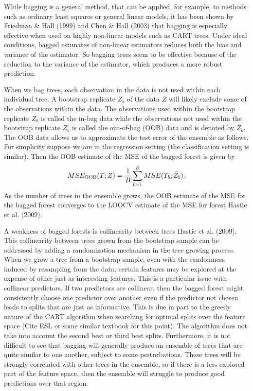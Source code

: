 \documentclass[12pt,twoside]{reedthesis}
\theoremstyle{definition}
\theoremstyle{definition}
\theoremstyle{definition}
\theoremstyle{remark}
\begin{document}
While bagging is a general method, that can be applied, for example, to
methods such as ordinary least squares or general linear models, it has
been shown by Friedman \& Hall (1999) and Chen \& Hall (2003) that
bagging is especially effective when used on highly non-linear models
such as CART trees. Under ideal conditions, bagged estimates of
non-linear estimators reduces both the bias and variance of the
estimator. So bagging trees seem to be effective because of the
reduction to the variance of the estimator, which produces a more robust
prediction. \par

When we bag trees, each observation in the data is not used within each
individual tree. A bootstrap replicate \(Z_b\) of the data \(Z\) will
likely exclude some of the observations within the data. The
observations used within the bootstrap replicate \(Z_b\) is called the
in-bag data while the observations not used within the bootstrap
replicate \(Z_b\) is called the out-of-bag (OOB) data and is denoted by
\(\bar{Z}_b\). The OOB data allows us to approximate the test error of
the ensemble as follows. For simplicity suppose we are in the regression
setting (the classification setting is similar). Then the OOB estimate
of the MSE of the bagged forest is given by
\[MSE_{\textup{OOB}}(T;Z)=\frac{1}{B}\sum_{b=1}^B MSE(T_b;\bar{Z}_b).\]
As the number of trees in the ensemble grows, the OOB estimate of the
MSE for the bagged forest converges to the LOOCV estimate of the MSE for
forest Hastie et al. (2009). \par

A weakness of bagged forests is collinearity between trees Hastie et al.
(2009). This collinearity between trees grown from the bootstrap sample
can be addressed by adding a randomization mechanism in the tree growing
process. When we grow a tree from a bootstrap sample, even with the
randomness induced by resampling from the data, certain features may be
explored at the expense of other just as interesting features. This is a
particular issue with collinear predictors. If two predictors are
collinear, then the bagged forest might consistently choose one
predictor over another even if the predictor not chosen leads to splits
that are just as informative. This is due in part to the greedy nature
of the CART algorithm when searching for optimal splits over the feature
space (Cite ESL or some similar textbook for this point). The algorithm
does not take into account the second best or third best splits.
Furthermore, it is not difficult to see that bagging will generally
produce an ensemble of trees that are quite similar to one another,
subject to some perturbations. These trees will be strongly correlated
with other trees in the ensemble, so if there is a less explored part of
the feature space, then the ensemble will struggle to produce good
predictions over that region. \par
\end{document}
